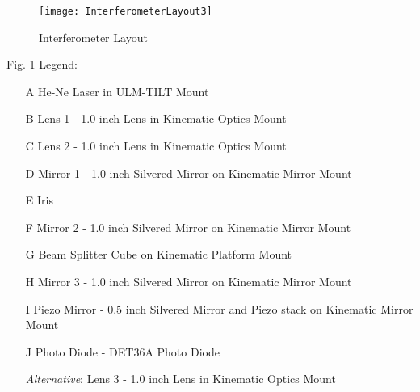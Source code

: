 \begin{figure}[ht]
\centering
\texttt{[image: InterferometerLayout3]}
\caption{Interferometer Layout}
\label{fig:interferometer}
\end{figure}
\newpage
Fig. 1 Legend:
\begin{enumerate} \itemsep1pt \parskip0pt 
   \item[A] He-Ne Laser in ULM-TILT Mount
   \item[B] Lens 1 - 1.0 inch Lens in Kinematic Optics Mount
   \item[C] Lens 2 - 1.0 inch Lens in Kinematic Optics Mount
   \item[D] Mirror 1 - 1.0 inch Silvered Mirror on Kinematic Mirror Mount
   \item[E] Iris
   \item[F] Mirror 2 - 1.0 inch Silvered Mirror on Kinematic Mirror Mount
   \item[G] Beam Splitter Cube on Kinematic Platform Mount
   \item[H] Mirror 3 - 1.0 inch Silvered Mirror on Kinematic Mirror Mount
   \item[I] Piezo Mirror - 0.5 inch Silvered Mirror and Piezo stack on Kinematic Mirror Mount
   \item[J] Photo Diode - DET36A Photo Diode

    \emph{Alternative}: Lens 3 - 1.0 inch Lens in Kinematic Optics Mount
\end{enumerate}
